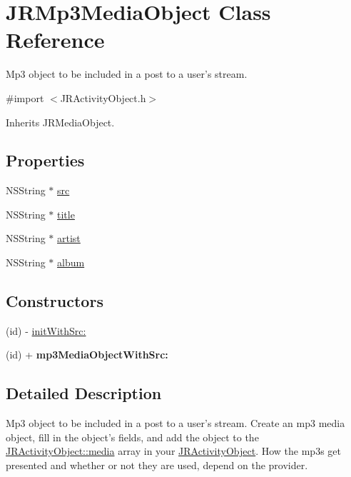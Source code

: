 \hypertarget{interface_j_r_mp3_media_object}{
\section{JRMp3MediaObject Class Reference}
\label{interface_j_r_mp3_media_object}
}


Mp3 object to be included in a post to a user's stream.  




{\ttfamily \#import $<$JRActivityObject.h$>$}



Inherits JRMediaObject.

\subsection*{Properties}
\begin{DoxyCompactItemize}
\item 
NSString $\ast$ \hyperlink{interface_j_r_mp3_media_object_ae6ae676c1841834aba74a2c5d11cb54c}{src}
\item 
NSString $\ast$ \hyperlink{interface_j_r_mp3_media_object_accd252e22f704fd4b314217317f0b5cb}{title}
\item 
NSString $\ast$ \hyperlink{interface_j_r_mp3_media_object_aa164b3ecc14b03d36f5093d3d4d7f5b1}{artist}
\item 
NSString $\ast$ \hyperlink{interface_j_r_mp3_media_object_adefc6578183aa09a492b229696f581df}{album}
\end{DoxyCompactItemize}
\subsection*{Constructors}
\label{_amgrp559a25fdb98a7d1fd1c3771ac568d5e9}
 \begin{DoxyCompactItemize}
\item 
(id) -\/ \hyperlink{interface_j_r_mp3_media_object_a15eba85b9094d28d8d9bc6b9625ee55c}{initWithSrc:}
\item 
\hypertarget{interface_j_r_mp3_media_object_ab8788e64a6d5b868e1b0689d55d68246}{
(id) + {\bfseries mp3MediaObjectWithSrc:}}
\label{interface_j_r_mp3_media_object_ab8788e64a6d5b868e1b0689d55d68246}

\end{DoxyCompactItemize}


\subsection{Detailed Description}
Mp3 object to be included in a post to a user's stream. Create an mp3 media object, fill in the object's fields, and add the object to the \hyperlink{interface_j_r_activity_object_a2e4ff78f83d0f353f8e0c17ed48ce0ab}{JRActivityObject::media} array in your \hyperlink{interface_j_r_activity_object}{JRActivityObject}. How the mp3s get presented and whether or not they are used, depend on the provider.

